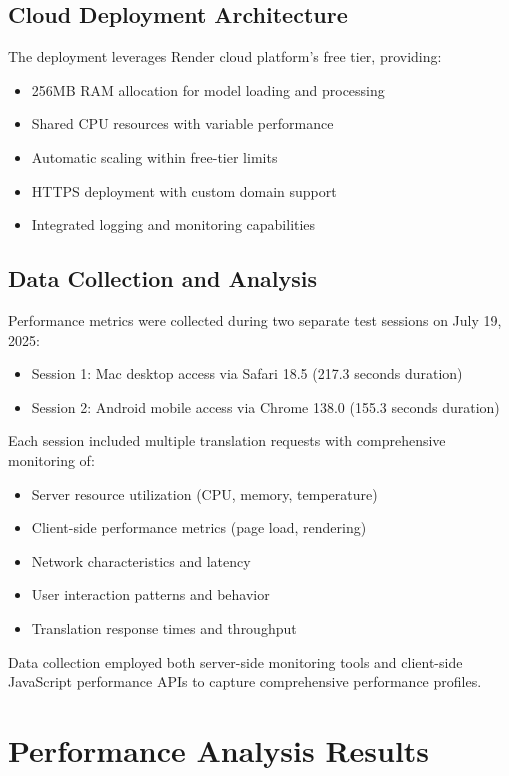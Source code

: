 \documentclass[conference]{IEEEtran}
\begin{document}
\subsection{Cloud Deployment Architecture}

The deployment leverages Render cloud platform's free tier, providing:
\begin{itemize}
    \item 256MB RAM allocation for model loading and processing
    \item Shared CPU resources with variable performance
    \item Automatic scaling within free-tier limits
    \item HTTPS deployment with custom domain support
    \item Integrated logging and monitoring capabilities
\end{itemize}

\subsection{Data Collection and Analysis}

Performance metrics were collected during two separate test sessions on July 19, 2025:
\begin{itemize}
    \item Session 1: Mac desktop access via Safari 18.5 (217.3 seconds duration)
    \item Session 2: Android mobile access via Chrome 138.0 (155.3 seconds duration)
\end{itemize}

Each session included multiple translation requests with comprehensive monitoring of:
\begin{itemize}
    \item Server resource utilization (CPU, memory, temperature)
    \item Client-side performance metrics (page load, rendering)
    \item Network characteristics and latency
    \item User interaction patterns and behavior
    \item Translation response times and throughput
\end{itemize}

Data collection employed both server-side monitoring tools and client-side JavaScript performance APIs to capture comprehensive performance profiles.

\section{Performance Analysis Results}
\end{document}
